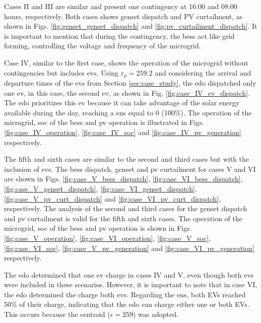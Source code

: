\documentclass[preprint, 10pt, 5p]{elsarticle}
\begin{document}
Cases II and III are similar and present one contingency at 16:00 
and 08:00 hours, respectively. Both cases shows genset dispatch and PV 
curtailment, as shown in Figs. \ref{fig:genset_genset_dispatch} 
and \ref{fig:pv_curtailment_dispatch}. It is important to mention that 
during the contingency, the \gls{bess} act like grid forming, controlling 
the voltage and frequency of the microgrid. 

Case IV, similar to the first case, shows the operation of the microgrid 
without contingencies but includes \glspl{ev}. 
Using $\varepsilon_{p} = 259.2$ and 
considering the arrival and departure times of the \glspl{ev} from Section
\ref{sec:case_study}, the \gls{edo} dispatched only one \gls{ev}, in 
this case, the second \gls{ev}, as shown in 
Fig. \ref{fig:case_IV_ev_dispatch}. The \gls{edo} prioritizes 
this \gls{ev} because it can take advantage of the solar energy 
available during the day, reaching a \gls{ens} equal to $0$ (100\%). 
The operation of the microgrid, \gls{soc} of 
the \gls{bess} and \gls{pv} operation is illustrated in 
Figs. \ref{fig:case_IV_operation}, \ref{fig:case_IV_soc} 
and \ref{fig:case_IV_pv_generation} respectively.

The fifth and sixth cases are similar to the second and third cases but with 
the inclusion of \glspl{ev}. The \gls{bess} dispatch, genset and 
\gls{pv} curtailment for cases V and VI are shown in 
Figs. \ref{fig:case_V_bess_dispatch}, \ref{fig:case_VI_bess_dispatch}, 
\ref{fig:case_V_genset_dispatch}, \ref{fig:case_VI_genset_dispatch}, 
\ref{fig:case_V_pv_curt_dispatch} and \ref{fig:case_VI_pv_curt_dispatch}, 
respectively. The analysis of the
second and third cases for the genset dispatch and \gls{pv} curtailment is 
valid for the fifth and sixth cases. The operation of the microgrid, 
\gls{soc} of the \gls{bess} and \gls{pv} operation is shown in 
Figs. \ref{fig:case_V_operation}, \ref{fig:case_VI_operation}, 
\ref{fig:case_V_soc}, \ref{fig:case_VI_soc}, \ref{fig:case_V_pv_generation}
and \ref{fig:case_VI_pv_generation} respectively.

The \gls{edo} determined that one \gls{ev} charge in cases IV and V, even 
though both \glspl{ev} were included in these scenarios. However, it is 
important to note that in case VI, the \gls{edo} determined 
the charge both \glspl{ev}. Regarding the \gls{ens}, both EVs reached 50\% 
of their charge, indicating that the \gls{edo} can charge either one or 
both EVs. This occurs because the centroid ($\epsilon = 259$) was adopted.
\end{document}
